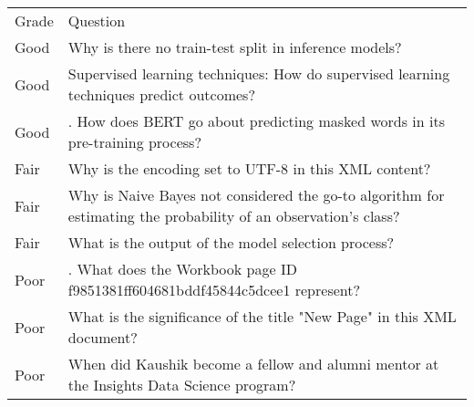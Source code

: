 \begin{tabular}{ll}
Grade & Question \\
Good &  Why is there no train-test split in inference models? \\
Good &  Supervised learning techniques: How do supervised learning techniques predict outcomes? \\
Good & . How does BERT go about predicting masked words in its pre-training process? \\
Fair &  Why is the encoding set to UTF-8 in this XML content? \\
Fair &  Why is Naive Bayes not considered the go-to algorithm for estimating the probability of an observation's class? \\
Fair &  What is the output of the model selection process? \\
Poor & . What does the Workbook page ID f9851381ff604681bddf45844c5dcee1 represent? \\
Poor &  What is the significance of the title "New Page" in this XML document? \\
Poor &  When did Kaushik become a fellow and alumni mentor at the Insights Data Science program? \\
\end{tabular}
